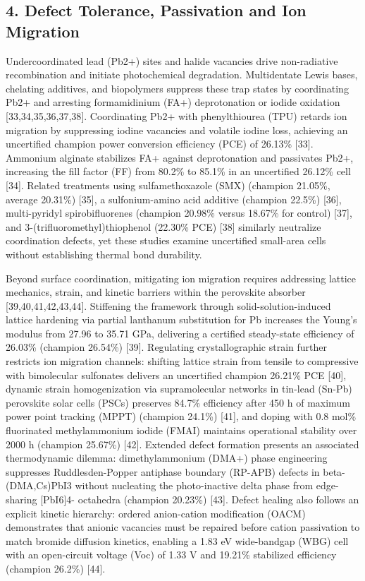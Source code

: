\documentclass[
  11pt,
]{article}
\begin{document}
\subsection{4. Defect Tolerance, Passivation and Ion
Migration}\label{defect-tolerance-passivation-and-ion-migration}

Undercoordinated lead (Pb2+) sites and halide vacancies drive
non-radiative recombination and initiate photochemical degradation.
Multidentate Lewis bases, chelating additives, and biopolymers suppress
these trap states by coordinating Pb2+ and arresting formamidinium (FA+)
deprotonation or iodide oxidation {[}33,34,35,36,37,38{]}. Coordinating
Pb2+ with phenylthiourea (TPU) retards ion migration by suppressing
iodine vacancies and volatile iodine loss, achieving an uncertified
champion power conversion efficiency (PCE) of 26.13\% {[}33{]}. Ammonium
alginate stabilizes FA+ against deprotonation and passivates Pb2+,
increasing the fill factor (FF) from 80.2\% to 85.1\% in an uncertified
26.12\% cell {[}34{]}. Related treatments using sulfamethoxazole (SMX)
(champion 21.05\%, average 20.31\%) {[}35{]}, a sulfonium-amino acid
additive (champion 22.5\%) {[}36{]}, multi-pyridyl spirobifluorenes
(champion 20.98\% versus 18.67\% for control) {[}37{]}, and
3-(trifluoromethyl)thiophenol (22.30\% PCE) {[}38{]} similarly
neutralize coordination defects, yet these studies examine uncertified
small-area cells without establishing thermal bond durability.

Beyond surface coordination, mitigating ion migration requires
addressing lattice mechanics, strain, and kinetic barriers within the
perovskite absorber {[}39,40,41,42,43,44{]}. Stiffening the framework
through solid-solution-induced lattice hardening via partial lanthanum
substitution for Pb increases the Young's modulus from 27.96 to 35.71
GPa, delivering a certified steady-state efficiency of 26.03\% (champion
26.54\%) {[}39{]}. Regulating crystallographic strain further restricts
ion migration channels: shifting lattice strain from tensile to
compressive with bimolecular sulfonates delivers an uncertified champion
26.21\% PCE {[}40{]}, dynamic strain homogenization via supramolecular
networks in tin-lead (Sn-Pb) perovskite solar cells (PSCs) preserves
84.7\% efficiency after 450 h of maximum power point tracking (MPPT)
(champion 24.1\%) {[}41{]}, and doping with 0.8 mol\% fluorinated
methylammonium iodide (FMAI) maintains operational stability over 2000 h
(champion 25.67\%) {[}42{]}. Extended defect formation presents an
associated thermodynamic dilemma: dimethylammonium (DMA+) phase
engineering suppresses Ruddlesden-Popper antiphase boundary (RP-APB)
defects in beta-(DMA,Cs)PbI3 without nucleating the photo-inactive delta
phase from edge-sharing {[}PbI6{]}4- octahedra (champion 20.23\%)
{[}43{]}. Defect healing also follows an explicit kinetic hierarchy:
ordered anion-cation modification (OACM) demonstrates that anionic
vacancies must be repaired before cation passivation to match bromide
diffusion kinetics, enabling a 1.83 eV wide-bandgap (WBG) cell with an
open-circuit voltage (Voc) of 1.33 V and 19.21\% stabilized efficiency
(champion 26.2\%) {[}44{]}.
\end{document}
